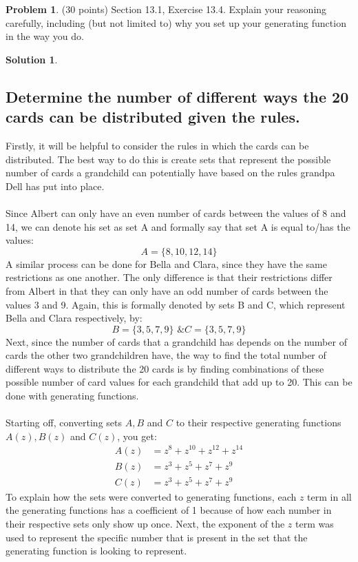 \documentclass{article}
\theoremstyle{definition}
\newtheorem{problem}{Problem}
\newtheorem*{solution}{Solution}
\begin{document}
\newpage
\begin{problem} (30 points) Section 13.1, Exercise 13.4. Explain your reasoning carefully, 
including (but not limited to) why you set up your generating function in the way you do.

\end{problem}
\begin{solution}
\hspace{1cm}
\subsection*{Determine the number of different ways the 20 cards can be distributed given the rules.}
Firstly, it will be helpful to consider the rules in which the cards can be distributed. The best way to do this is create sets that represent the possible number of cards a grandchild can potentially have based on the rules grandpa Dell has put into place.\\\\
Since Albert can only have an even number of cards between the values of 8 and 14, we can denote his set as set A and formally say that set A is equal to/has the values:
$$ A = \{8,10,12,14\} $$
A similar process can be done for Bella and Clara, since they have the same restrictions as one another. The only difference is that their restrictions differ from Albert in that they can only have an odd number of cards between the values 3 and 9. Again, this is formally denoted by sets B and C, which represent Bella and Clara respectively, by:
$$ B = \{3,5,7,9\} \mbox{ \& } C = \{3,5,7,9\}$$
Next, since the number of cards that a grandchild has depends on the number of cards the other two grandchildren have, the way to find the total number of different ways to distribute the 20 cards is by finding combinations of these possible number of card values for each grandchild that add up to 20. This can be done with generating functions.\\\\
Starting off, converting sets $A, B$ and $C$ to their respective generating functions $A(z),  B(z)$ and $C(z)$, you get:
\begin{align*}
A(z) &= z^8 + z^{10} + z^{12} + z^{14}\\
B(z) &= z^3 + z^5 + z^7 + z^9\\
C(z) &= z^3 + z^5 + z^7 + z^9
\end{align*}
To explain how the sets were converted to generating functions, each $z$ term in all the generating functions has a coefficient of 1 because of how each number in their respective sets only show up once. Next, the exponent of the $z$ term was used to represent the specific number that is present in the set that the generating function is looking to represent.\\\\

\end{solution}
\end{document}
